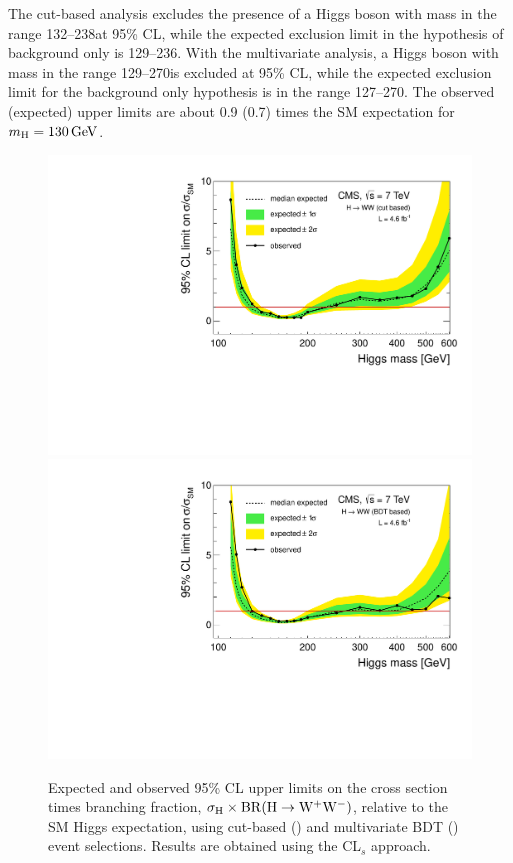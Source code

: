 \documentclass[12pt,twoside,a4paper,cmspaper,final,collab]{cms-tdr}
\begin{document}
The cut-based analysis excludes the presence of a Higgs boson
with mass in the range 132--238\GeV at 95\% CL, while the
expected exclusion limit in the hypothesis of background only
is 129--236\GeV. With the multivariate analysis,
a Higgs boson with mass in the range
129--270\GeV is excluded at 95\% CL, while the expected exclusion limit for the
background only hypothesis is in the range 127--270\GeV.
The observed (expected) upper limits are about 0.9 (0.7) times
the SM expectation for $m_{\mathrm{H}}=130\,\text{Ge\hspace{-.08em}V}$.



\begin{figure}[htbp]
  \begin{center}
   \includegraphics[width=\cmsFigWidth]{limits_nj_cut}
   \includegraphics[width=\cmsFigWidth]{limits_nj_shape}
    \caption{Expected and observed 95\% CL upper
       limits on the cross section times branching fraction,
       $\sigma_{\mathrm{H}} \times \mathrm{BR}(\mathrm{H} \to \mathrm{W^+}{}\mathrm{W^-})$,
       relative to the SM Higgs expectation, using cut-based (\cmsLeft) and
       multivariate BDT (\cmsRight) event selections. Results are obtained using the CL$_{s}$ approach.}
    \label{fig:xsLimCuts}
  \end{center}
\end{figure}
\end{document}
